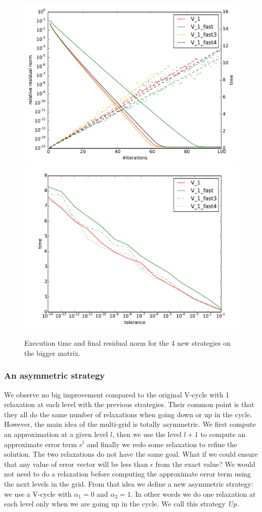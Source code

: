 \documentclass[sigplan]{acmart}
\begin{document}
  \begin{figure}
  \includegraphics[width=0.49\linewidth]{figs/convergence_fast.pdf}
   \includegraphics[width=0.49\linewidth]{figs/time_convergence_fast.pdf}
   \caption{Execution time and final residual norm for the 4 new strategies on the bigger matrix.}
   \label{fig.newstrat}
  \end{figure}
  
\subsubsection{An asymmetric strategy}
\label{sec.assymetric}
  We observe no big improvement compared to the original V-cycle with 1 relaxation at each level with the previous strategies.
  Their common point is that they all do the same number of relaxations when going down or up in the cycle. However, the main idea of the multi-grid is totally asymmetric.
  We first compute an approximation at a given level $l$, then we use the level $l+1$ to compute an approximate error term $e^l$ and finally we redo some relaxation to refine the solution. The two relaxations do not have the same goal.
  What if we could ensure that any value of error vector will be less than $\epsilon$ from the exact value? We would not need to do a relaxation
  before computing the approximate error term using the next levels in the grid. From that idea we define a new asymmetric strategy: we use a V-cycle with $\alpha_1 = 0$ and $\alpha_2 = 1$. In other words
  we do one relaxation at each level only when we are going up in the cycle. We call this strategy \emph{Up}.
  
\end{document}
